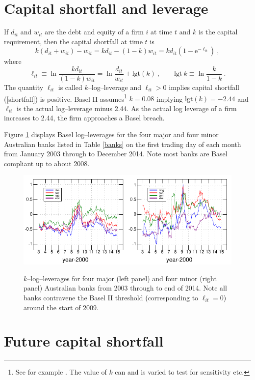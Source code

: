\documentclass[authoryear]{elsarticle}
\newcommand{\logit}{\mathrm{lgt}}
\newcommand{\e}{\mathrm{e}}
\newcommand{\eref}[1]{(\ref{#1})}
\newcommand{\fref}[1]{Figure \ref{#1}}
\newcommand{\tref}[1]{Table \ref{#1}}
\newcommand{\cq}{\ , \qquad}
\newcommand{\be}[1]{\begin{equation}\label{#1}}
\newcommand{\ee}{\end{equation}}
\begin{document}
\section{Capital shortfall and leverage}

If $d_{it}$ and $w_{it}$ are the debt and equity of a firm $i$ at time $t$ and $k$ is the capital requirement,  then the capital shortfall at time $t$ is 
\be{shortfall}
k(d_{it}+w_{it}) - w_{it} = kd_{it}  - (1-k) w_{it} = kd_{it}\left(1-\e^{-\ell_{it}}\right)\ ,
\ee
where 
$$
\ell_{it} \equiv  \ln\frac{kd_{it}}{(1-k)w_{it}}= \ln\frac{d_{it}}{w_{it}}+\logit(k) \cq \logit\ k\equiv \ln \frac{k}{1-k} \ .
$$
The quantity $\ell_{it}$ is called   $k$--log--leverage and $\ell_{it}>0$ implies capital shortfall \eref{shortfall} is positive.
Basel II assumes\footnote{See for example \cite{brownlees2015}.   The value of $k$ can and is varied to test for sensitivity etc.} 
 $k=0.08$ implying $\logit(k)=-2.44$ and  $\ell_{it}$ is the actual log--leverage minus 2.44.   
As the actual  log leverage of a firm  increases to 2.44, the firm approaches a Basel breach. 

\fref{Bloglev} displays Basel log--leverages for the four major and four minor Australian banks listed in \tref{banks} on the first trading day of each month from January 2003  through to December 2014.  Note most banks are Basel compliant up to about 2008.

\begin{figure}[htbp]
\begin{center}
\label{Bloglev}
\includegraphics{Bloglev.pdf}
\caption{$k$--log--leverages for four major (left panel) and four minor (right panel) Australian banks from 2003 through to end of 2014.  Note all banks contravene the Basel II threshold (corresponding to $\ell_{it}=0$) around the start of 2009.}
\end{center}
\end{figure}


\section{Future capital shortfall}
\end{document}
